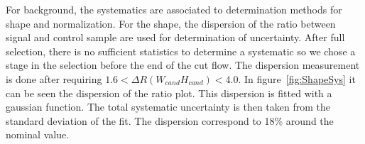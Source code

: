\begin{table*}[htbH]
\begin{center}
\end{center}
\caption{Summary of uncertainties for signal samples\label{tab:sys}}
\end{table*}

For background, the systematics are associated to determination methods for shape and normalization. For the shape, the dispersion of the ratio between signal and control sample are used for determination of uncertainty. After full selection, there is no sufficient statistics to determine a systematic so we chose a stage in the selection before the end of the cut flow. The dispersion measurement is done after requiring $1.6 < \Delta R (W_{cand} H_{cand}) < 4.0$. In figure~\ref{fig:ShapeSys} it can be seen the dispersion of the ratio plot. This dispersion is fitted with a gaussian function. The total systematic uncertainty is then taken from the standard deviation of the fit. The dispersion correspond to 18\% around the nominal value.


